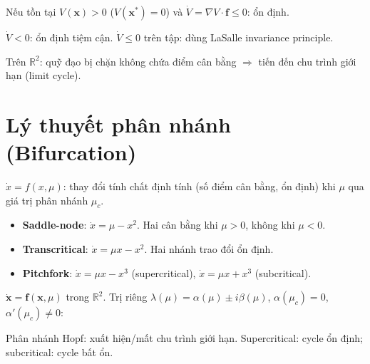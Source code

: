 \documentclass[12pt,a4paper]{article}
\begin{document}
\begin{dinhly}[title={Ổn định Lyapunov}]
  Nếu tồn tại $V(\mathbf{x}) > 0$ ($V(\mathbf{x}^*) = 0$) và $\dot{V} = \nabla V \cdot \mathbf{f} \le 0$: ổn định.

  $\dot{V} < 0$: ổn định tiệm cận. $\dot{V} \le 0$ trên tập: dùng LaSalle invariance principle.
\end{dinhly}

\begin{dinhly}[title={Poincaré--Bendixson}]
  Trên $\mathbb{R}^2$: quỹ đạo bị chặn không chứa điểm cân bằng $\Rightarrow$ tiến đến chu trình giới hạn (limit cycle).
\end{dinhly}

\section{Lý thuyết phân nhánh (Bifurcation)}

\begin{dinhnghia}[title={Phân nhánh}]
  $\dot{x} = f(x, \mu)$: thay đổi tính chất định tính (số điểm cân bằng, ổn định) khi $\mu$ qua giá trị phân nhánh $\mu_c$.
\end{dinhnghia}

\begin{tinhchat}[title={Phân nhánh cơ bản (1D)}]
  \begin{itemize}
    \item \textbf{Saddle-node}: $\dot{x} = \mu - x^2$. Hai cân bằng khi $\mu > 0$, không khi $\mu < 0$.
    \item \textbf{Transcritical}: $\dot{x} = \mu x - x^2$. Hai nhánh trao đổi ổn định.
    \item \textbf{Pitchfork}: $\dot{x} = \mu x - x^3$ (supercritical), $\dot{x} = \mu x + x^3$ (subcritical).
  \end{itemize}
\end{tinhchat}

\begin{dinhly}[title={Phân nhánh Hopf}]
  $\dot{\mathbf{x}} = \mathbf{f}(\mathbf{x}, \mu)$ trong $\mathbb{R}^2$. Trị riêng $\lambda(\mu) = \alpha(\mu) \pm i\beta(\mu)$, $\alpha(\mu_c) = 0$, $\alpha'(\mu_c) \ne 0$:

  Phân nhánh Hopf: xuất hiện/mất chu trình giới hạn. Supercritical: cycle ổn định; subcritical: cycle bất ổn.
\end{dinhly}
\end{document}
